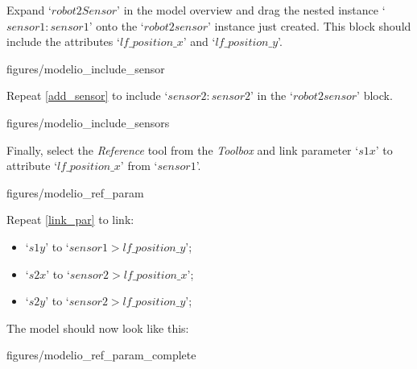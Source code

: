 \documentclass[11pt,a4paper]{../tutorial}
\begin{document}
\begin{instructions}
\newpage

\item \label{add_sensor} Expand `$robot2Sensor$' in the model overview and drag the nested instance `$sensor1: sensor1$' onto the `$robot2sensor$' instance just created. This block should include the attributes `$lf\_position\_x$' and `$lf\_position\_y$'.

\begin{center}
\begin{annotation}[width=0.7\linewidth]{figures/modelio_include_sensor}
    \end{annotation}
\end{center}

\item Repeat \ref{add_sensor} to include `$sensor2: sensor2$' in the `$robot2sensor$' block.

\begin{center}
\begin{annotation}[width=0.7\linewidth]{figures/modelio_include_sensors}
    \end{annotation}
\end{center}

\item \label{link_par} Finally, select the \emph{Reference} tool from the \emph{Toolbox} and link parameter `$s1x$' to attribute `$lf\_position\_x$' from `$sensor1$'.

\begin{center}
\begin{annotation}[width=0.7\linewidth]{figures/modelio_ref_param}
    \end{annotation}
\end{center}

\newpage

\item Repeat \ref{link_par} to link:
\begin{itemize}
	\item `$s1y$' to `$sensor1 > lf\_position\_y$';
	\item `$s2x$' to `$sensor2 > lf\_position\_x$';
	\item `$s2y$' to `$sensor2 > lf\_position\_y$';
\end{itemize}

The model should now look like this:

\begin{center}
\begin{annotation}[width=0.7\linewidth]{figures/modelio_ref_param_complete}
    \end{annotation}
\end{center}

\end{instructions}
\end{document}
